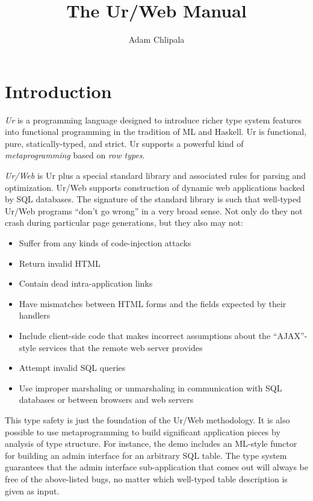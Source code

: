 \documentclass{article}
\begin{document}
\title{The Ur/Web Manual}
\author{Adam Chlipala}

\maketitle

\tableofcontents


\section{Introduction}

\emph{Ur} is a programming language designed to introduce richer type system features into functional programming in the tradition of ML and Haskell.  Ur is functional, pure, statically-typed, and strict.  Ur supports a powerful kind of \emph{metaprogramming} based on \emph{row types}.

\emph{Ur/Web} is Ur plus a special standard library and associated rules for parsing and optimization.  Ur/Web supports construction of dynamic web applications backed by SQL databases.  The signature of the standard library is such that well-typed Ur/Web programs ``don't go wrong'' in a very broad sense.  Not only do they not crash during particular page generations, but they also may not:

\begin{itemize}
\item Suffer from any kinds of code-injection attacks
\item Return invalid HTML
\item Contain dead intra-application links
\item Have mismatches between HTML forms and the fields expected by their handlers
\item Include client-side code that makes incorrect assumptions about the ``AJAX''-style services that the remote web server provides
\item Attempt invalid SQL queries
\item Use improper marshaling or unmarshaling in communication with SQL databases or between browsers and web servers
\end{itemize}

This type safety is just the foundation of the Ur/Web methodology.  It is also possible to use metaprogramming to build significant application pieces by analysis of type structure.  For instance, the demo includes an ML-style functor for building an admin interface for an arbitrary SQL table.  The type system guarantees that the admin interface sub-application that comes out will always be free of the above-listed bugs, no matter which well-typed table description is given as input.
\end{document}
